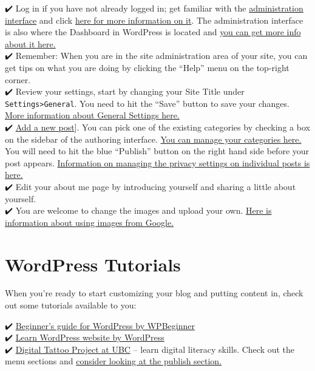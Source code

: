 \documentclass[
]{book}
\begin{document}
✔️ Log in if you have not already logged in; get familiar with the \href{http://sites.uci.edu/docs/start/dashboard/}{administration interface} and click \href{https://www.youtube.com/watch?v=-b569fs2t-Y}{here for more information on it}. The administration interface is also where the Dashboard in WordPress is located and \href{https://codex.wordpress.org/Dashboard_Screen}{you can get more info about it here.}\\
✔️ Remember: When you are in the site administration area of your site, you can get tips on what you are doing by clicking the ``Help'' menu on the top-right corner.\\
✔️ Review your settings, start by changing your Site Title under \texttt{Settings\textgreater{}General}. You need to hit the ``Save'' button to save your changes. \href{https://codex.wordpress.org/Settings_General_Screen}{More information about General Settings here.}\\
✔️ \href{http://www.wpbeginner.com/beginners-guide/how-to-add-a-new-post-in-wordpress-and-utilize-all-the-features/}{Add a new post}{]}. You can pick one of the existing categories by checking a box on the sidebar of the authoring interface. \href{http://www.wpbeginner.com/glossary/category/}{You can manage your categories here.} You will need to hit the blue ``Publish'' button on the right hand side before your post appears. \href{https://en.support.wordpress.com/pages/page-visibility/}{Information on managing the privacy settings on individual posts is here.}\\
✔️ Edit your about me page by introducing yourself and sharing a little about yourself.\\
✔️ You are welcome to change the images and upload your own. \href{https://www.youtube.com/watch?v=GtMOAaMFaPs}{Here is information about using images from Google.}

\hypertarget{wordpress-tutorials}{%
\section{WordPress Tutorials}\label{wordpress-tutorials}}

When you're ready to start customizing your blog and putting content in, check out some tutorials available to you:

✔️ \href{http://www.wpbeginner.com/start-here/}{Beginner's guide for WordPress by WPBeginner}\\
✔️ \href{https://learn.wordpress.com/}{Learn WordPress website by WordPress}\\
✔️ \href{http://digitaltattoo.ubc.ca/}{Digital Tattoo Project at UBC} -- learn digital literacy skills. Check out the menu sections and \href{http://digitaltattoo.ubc.ca/publish/}{consider looking at the publish section.}
\end{document}
